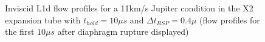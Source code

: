 \documentclass[a4paper,10pt]{article}
\begin{document}
\begin{figure}[htbp]
\begin{center}
{{      } \quad
      }
    \caption{Inviscid L1d flow profiles for a 11km/s Jupiter condition in the X2 expansion tube with $t_{hold} = 10 \mu s$ and $\Delta t_{RSP} = 0.4 \mu $ (flow profiles for the first $10 \mu s$ after diaphragm rupture displayed)}
    \label{fig:mars_profiles}
  \end{center}
\end{figure}
\end{document}
